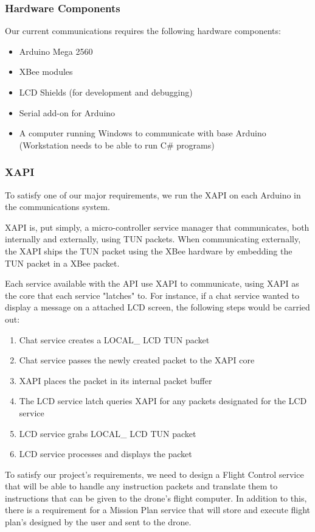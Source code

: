 	\subsubsection{Hardware Components}
	Our current communications requires the following hardware components:
	\begin{itemize}
		\item Arduino Mega 2560
		\item XBee modules
		\item LCD Shields (for development and debugging)
		\item Serial add-on for Arduino
		\item A computer running Windows to communicate with base Arduino (Workstation needs to be able to run C\# programs)
	\end{itemize}
	
	\subsubsection{XAPI}
	To satisfy one of our major requirements, we run the XAPI on each Arduino in the communications system. 
	
	XAPI is, put simply, a micro-controller service manager that communicates, both internally and externally, using TUN packets. When communicating externally, the XAPI ships the TUN packet using the XBee hardware by embedding the TUN packet in a XBee packet.
	
	Each service available with the API use XAPI to communicate, using XAPI as the core that each service "latches" to. For instance, if a chat service wanted to display a message on a attached LCD screen, the following steps would be carried out:
	\begin{enumerate}
		\item Chat service creates a LOCAL\_ LCD TUN packet
		\item Chat service passes the newly created packet to the XAPI core
		\item XAPI places the packet in its internal packet buffer
		\item The LCD service latch queries XAPI for any packets designated for the LCD service
		\item LCD service grabs LOCAL\_ LCD TUN packet
		\item LCD service processes and displays the packet
	\end{enumerate}
	
To satisfy our project's requirements, we need to design a Flight Control service that will be able to handle any instruction packets and translate them to instructions that can be given to the drone's flight computer. In addition to this, there is a requirement for a Mission Plan service that will store and execute flight plan's designed by the user and sent to the drone.
	

